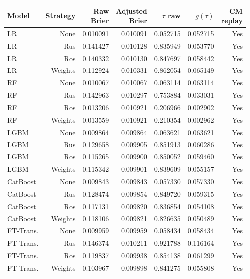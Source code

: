 \begin{tabular}{@{}l r r r r r r@{}}
\toprule
Model & Strategy & \shortstack{Raw\\Brier} & \shortstack{Adjusted\\Brier} & $\tau$ raw & $g(\tau)$ & \shortstack{CM\\replay} \\
\midrule
LR & None & 0.010091 & 0.010091 & 0.052715 & 0.052715 & Yes \\
LR & Rus & 0.141427 & 0.010128 & 0.835949 & 0.053770 & Yes \\
LR & Ros & 0.140332 & 0.010130 & 0.847697 & 0.058442 & Yes \\
LR & Weights & 0.112924 & 0.010331 & 0.862054 & 0.065149 & Yes \\
RF & None & 0.010067 & 0.010067 & 0.063114 & 0.063114 & Yes \\
RF & Rus & 0.142963 & 0.010297 & 0.753884 & 0.033031 & Yes \\
RF & Ros & 0.013206 & 0.010921 & 0.206966 & 0.002902 & Yes \\
RF & Weights & 0.013559 & 0.010921 & 0.210354 & 0.002962 & Yes \\
LGBM & None & 0.009864 & 0.009864 & 0.063621 & 0.063621 & Yes \\
LGBM & Rus & 0.129658 & 0.009905 & 0.851913 & 0.060286 & Yes \\
LGBM & Ros & 0.115265 & 0.009900 & 0.850052 & 0.059460 & Yes \\
LGBM & Weights & 0.115342 & 0.009901 & 0.839609 & 0.055157 & Yes \\
CatBoost & None & 0.009843 & 0.009843 & 0.057330 & 0.057330 & Yes \\
CatBoost & Rus & 0.128474 & 0.009854 & 0.849720 & 0.059315 & Yes \\
CatBoost & Ros & 0.117131 & 0.009820 & 0.836854 & 0.054108 & Yes \\
CatBoost & Weights & 0.118106 & 0.009821 & 0.826635 & 0.050489 & Yes \\
FT-Trans. & None & 0.009959 & 0.009959 & 0.058434 & 0.058434 & Yes \\
FT-Trans. & Rus & 0.146374 & 0.010211 & 0.921788 & 0.116164 & Yes \\
FT-Trans. & Ros & 0.119837 & 0.009938 & 0.854138 & 0.061299 & Yes \\
FT-Trans. & Weights & 0.103967 & 0.009898 & 0.841275 & 0.055808 & Yes \\
\bottomrule
\end{tabular}
